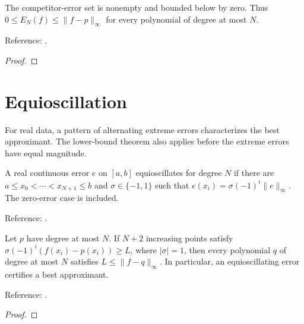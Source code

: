 \begin{supporting}

\begin{theorem}
\label{thm:best-uniform-error}
\leanok
The competitor-error set is nonempty and bounded below by zero. Thus
$0\le E_N(f)\le\|f-p\|_\infty$ for every polynomial of degree at most $N$.


Reference: \cite[Chapter 16]{atap}.
\end{theorem}
\begin{proof}
\leanok
\end{proof}

\end{supporting}

\section{Equioscillation}\label{sec:textbook-best-alternation}

For real data, a pattern of alternating extreme errors characterizes the best approximant. The lower-bound theorem also applies before the extreme errors have equal magnitude.

\begin{definition}
\label{def:equioscillation}
\leanok
A real continuous error $e$ on $[a,b]$ equioscillates for degree $N$ if there
are $a\le x_0<\cdots<x_{N+1}\le b$ and $\sigma\in\{-1,1\}$ such that
$e(x_i)=\sigma(-1)^i\|e\|_\infty$. The zero-error case is included.

Reference: \cite[Theorem 10.1]{atap}.
\end{definition}

\begin{theorem}
\label{thm:alternation-sufficient}
\leanok
Let $p$ have degree at most $N$. If $N+2$ increasing points satisfy
$\sigma(-1)^i(f(x_i)-p(x_i))\ge L$, where $|\sigma|=1$, then every
polynomial $q$ of degree at most $N$ satisfies $L\le\|f-q\|_\infty$.
In particular, an equioscillating error certifies a best approximant.

Reference: \cite[Theorem 10.1 and Exercise 10.3]{atap}.
\end{theorem}
\begin{proof}
\leanok
\end{proof}

